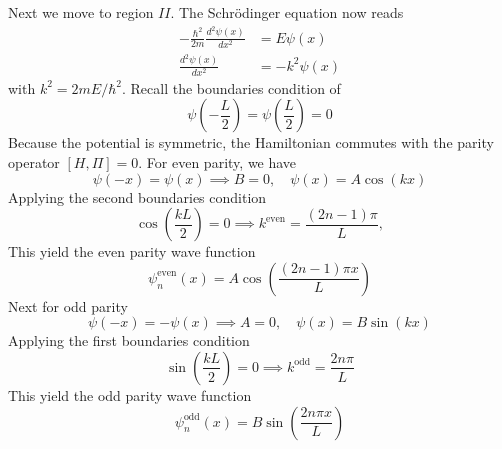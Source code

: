\documentclass[../../../main.tex]{subfiles}
\begin{document}
Next we move to region $II$.
The Schrödinger equation now reads
\begin{align*}
    -\frac{\hbar^2}{2m} \frac{d^2 \psi(x)}{dx^2} & =  E \psi(x)   \\
    \frac{d^2 \psi(x)}{dx^2}                     & = -k^2 \psi(x)
\end{align*}
with $k^2 =2 m E/\hbar^2.$
Recall the boundaries condition of
\begin{equation*}
    \psi \left( -\frac{L }{2 } \right) =\psi \left( \frac{L }{2 } \right) =0
\end{equation*}
Because the potential is symmetric, the Hamiltonian commutes with the parity operator $[H,\Pi] = 0$.
For even parity, we have
\begin{equation*}
    \psi(-x) = \psi(x) \implies B = 0, \quad \psi(x) = A \cos(kx)
\end{equation*}
Applying the second boundaries condition
\begin{equation*}
    \cos\left(\frac{k L}{2}\right) = 0\implies k^{\text{even}} = \frac{(2n-1)\pi}{L},
\end{equation*}
This yield the even parity wave function
\begin{equation*}
    \psi_n^{\text{even}}(x) =A \cos\left(\frac{(2n-1)\pi x}{L}\right)
\end{equation*}
Next for odd parity
\begin{equation*}
    \psi(-x) = -\psi(x) \implies A = 0, \quad \psi(x) = B \sin(kx)
\end{equation*}
Applying the first boundaries condition
\begin{equation*}
    \sin\left(\frac{k L}{2}\right) = 0 \implies k^{\text{odd}} = \frac{2 n \pi}{L}
\end{equation*}
This yield the odd parity wave function
\begin{equation*}
    \psi_n^{\text{odd}}(x) = B \sin\left(\frac{2 n \pi x}{L}\right)
\end{equation*}
\end{document}
